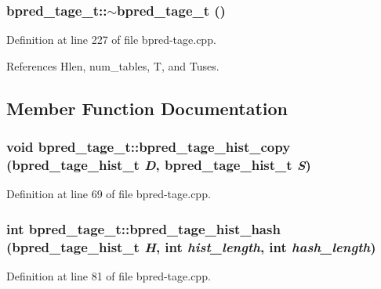 \subsubsection[{$\sim$bpred\_\-tage\_\-t}]{\setlength{\rightskip}{0pt plus 5cm}bpred\_\-tage\_\-t::$\sim$bpred\_\-tage\_\-t ()\hspace{0.3cm}{\tt  [inline]}}\label{classbpred__tage__t_8735c4a66cd8e167fb92e6e8af8834d8}




Definition at line 227 of file bpred-tage.cpp.

References Hlen, num\_\-tables, T, and Tuses.

\subsection{Member Function Documentation}
\subsubsection[{bpred\_\-tage\_\-hist\_\-copy}]{\setlength{\rightskip}{0pt plus 5cm}void bpred\_\-tage\_\-t::bpred\_\-tage\_\-hist\_\-copy ({\bf bpred\_\-tage\_\-hist\_\-t} {\em D}, \/  {\bf bpred\_\-tage\_\-hist\_\-t} {\em S})\hspace{0.3cm}{\tt  [inline, private]}}\label{classbpred__tage__t_6f3d7d1edc6616a354ccfcb6facd0937}




Definition at line 69 of file bpred-tage.cpp.
\subsubsection[{bpred\_\-tage\_\-hist\_\-hash}]{\setlength{\rightskip}{0pt plus 5cm}int bpred\_\-tage\_\-t::bpred\_\-tage\_\-hist\_\-hash ({\bf bpred\_\-tage\_\-hist\_\-t} {\em H}, \/  int {\em hist\_\-length}, \/  int {\em hash\_\-length})\hspace{0.3cm}{\tt  [inline, private]}}\label{classbpred__tage__t_5522b9b663201ae4945823291f38add2}




Definition at line 81 of file bpred-tage.cpp.
